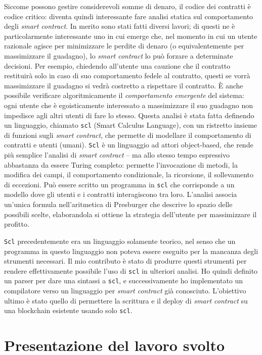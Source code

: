 \documentclass[12pt,a4paper]{report}
\begin{document}
Siccome possono gestire considerevoli somme di denaro, il codice dei
contratti è codice critico: diventa quindi interessante fare analisi
statica sul comportamento degli \emph{smart contract}. In merito sono
stati fatti diversi lavori; di questi ne è particolarmente interessante
uno in cui emerge che, nel momento in cui un utente razionale agisce per
minimizzare le perdite di denaro (o equivalentemente per massimizzare il
guadagno), lo \emph{smart contract} lo può forzare a determinate
decisioni. Per esempio, chiedendo all'utente una cauzione che il
contratto restituirà solo in caso di suo comportamento fedele al
contratto, questi se vorrà massimizzare il guadagno si vedrà costretto a
rispettare il contratto. È anche possibile verificare algoritmicamente
il \emph{comportamento emergente} del sistema: ogni utente che è
egoisticamente interessato a massimizzare il suo guadagno non impedisce
agli altri utenti di fare lo stesso. Questa analisi è stata fatta
definendo un linguaggio, chiamato \texttt{scl} (Smart Calculus
Language), con un ristretto insieme di funzioni sugli \emph{smart
contract}, che permette di modellare il comportamento di contratti e
utenti (umani). \texttt{Scl} è un linguaggio ad attori object-based, che
rende più semplice l'analisi di \emph{smart contract} -- ma allo stesso
tempo espressivo abbastanza da essere Turing completo: permette
l'invocazione di metodi, la modifica dei campi, il comportamento
condizionale, la ricorsione, il sollevamento di eccezioni. Può essere
scritto un programma in \texttt{scl} che corrisponde a un modello dove
gli utenti e i contratti interagiscono tra loro. L'analisi associa
un'unica formula nell'aritmetica di Presburger che descrive lo spazio
delle possibili scelte, elaborandola si ottiene la strategia dell'utente
per massimizzare il profitto.

\texttt{Scl} precedentemente era un linguaggio solamente teorico, nel
senso che un programma in questo linguaggio non poteva essere eseguito
per la mancanza degli strumenti necessari. Il mio contributo è stato di
produrre questi strumenti per rendere effettivamente possibile l'uso di
\texttt{scl} in ulteriori analisi. Ho quindi definito un parser per dare
una sintassi a \texttt{scl}, e successivamente ho implementato un
compilatore verso un linguaggio per \emph{smart contract} già
conosciuto. L'obiettivo ultimo è stato quello di permettere la scrittura
e il deploy di \emph{smart contract} su una blockchain esistente usando
solo \texttt{scl}.

\hypertarget{presentazione-del-lavoro-svolto}{%
\section{Presentazione del lavoro
svolto}\label{presentazione-del-lavoro-svolto}}
\end{document}
